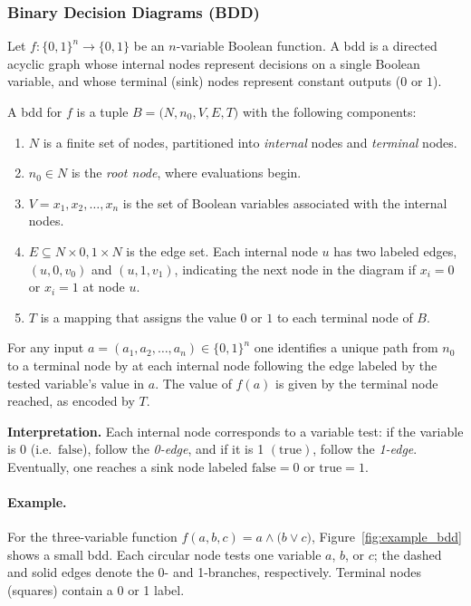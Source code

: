 \subsubsection{Binary Decision Diagrams (BDD)}
\label{sec:bdd}

Let $f: \{0,1\}^n \to \{0,1\}$ be an $n$-variable Boolean function. A \acrfull{bdd} is a directed acyclic graph whose internal nodes represent decisions on a single Boolean variable, and whose terminal (sink) nodes represent constant outputs ($0$ or $1$).

\begin{definition}
\label{def:bdd}
A \acrlong{bdd} for $f$ is a tuple $B =\bigl(N,n_0,V,E,T\bigr)$ with the following components:
\begin{enumerate}
\item $N$ is a finite set of nodes, partitioned into \emph{internal} nodes and \emph{terminal} nodes.
\item $n_0 \in N$ is the \emph{root node}, where evaluations begin.
\item $V={x_1,x_2,\dots,x_n}$ is the set of Boolean variables associated with the internal nodes.
\item $E \subseteq N \times {0,1} \times N$ is the edge set. Each internal node $u$ has two labeled edges, $(u,0,v_0)$ and $(u,1,v_1)$, indicating the next node in the diagram if $x_i=0$ or $x_i=1$ at node $u$.
\item $T$ is a mapping that assigns the value $0$ or $1$ to each terminal node of $B$.
\end{enumerate}
For any input $a = (a_1,a_2,\dots,a_n)\in\{0,1\}^n$ one identifies a unique path from $n_0$ to a terminal node by at each internal node following the edge labeled by the tested variable's value in $a$. The value of $f(a)$ is given by the terminal node reached, as encoded by $T$.
\end{definition}

\noindent\textbf{Interpretation.} Each internal node corresponds to a variable test: if the variable is $0$ (i.e.\ $\text{false}$), follow the \emph{0-edge}, and if it is 1 $(\text{true})$, follow the \emph{1-edge}. Eventually, one reaches a sink node labeled $\text{false}=0$ or $\text{true}=1$.

\paragraph{Example.} For the three-variable function
$f(a,b,c)=a \land \bigl(b \lor c\bigr)$,
Figure~\ref{fig:example_bdd} shows a small \acrshort{bdd}. Each circular node tests one variable $a$, $b$, or $c$; the dashed and solid edges denote the 0- and 1-branches, respectively. Terminal nodes (squares) contain a 0 or 1 label.

